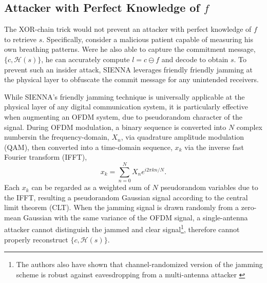 

\subsection{Attacker with Perfect Knowledge of $f$}
The XOR-chain trick would not prevent an attacker with perfect knowledge of $f$ to retrieve $s$. Specifically, consider a malicious patient capable of measuring his own breathing patterns. Were he also able to capture the commitment message, $\{c, \mathcal{H}(s)\}$, he can accurately compute $l = c  \ominus f$ and decode to obtain $s$. To prevent such an insider attack, SIENNA leverages friendly friendly jamming at the physical layer to obfuscate the commit message for any unintended receivers.

While SIENNA's friendly jamming technique is universally applicable at the physical layer of any digital communication system, it is particularly effective when augmenting an OFDM system, due to pseudorandom character of the signal. During OFDM modulation, a binary sequence is converted into $N$ complex numbersin the frequency-domain, $X_n$, via quadrature amplitude modulation (QAM), then converted into a time-domain sequence, $x_k$ via the inverse fast Fourier transform (IFFT),
\[
x_k = \sum_{n=0}^{N} X_n e^{i2\pi k n / N}.
\]
Each $x_k$ can be regarded as a weighted sum of $N$ pseudorandom variables due to the IFFT, resulting a pseudorandom Gaussian signal according to the central limit theorem (CLT). When the jamming signal is drawn randomly from a zero-mean Gaussian with the same variance of the OFDM signal, a single-antenna attacker cannot distinguish the jammed and clear signal\footnote{The authors also have shown that channel-randomized version of the jamming scheme is robust against eavesdropping from a multi-antenna attacker \cite{SteinmetzerLockpickingPhysicalLayer2015, PanROBinKnownPlaintextAttack2020, MelcherIJamChannelRandomization2020}}, therefore cannot properly reconstruct $\{c, \mathcal{H}(s)\}$.

